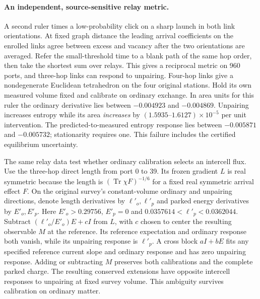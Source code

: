 \documentclass[11pt]{article}
\begin{document}
\paragraph{An independent, source-sensitive relay metric.}
A second ruler times a low-probability click on a sharp launch in
both link orientations. At fixed graph distance the leading arrival
coefficients on the enrolled links agree between excess and vacancy
after the two orientations are averaged. Refer the small-threshold
time to a blank path of the same hop order, then take the shortest
sum over relays. This gives a reciprocal metric on 960 ports, and
three-hop links can respond to unpairing. Four-hop links give a
nondegenerate Euclidean tetrahedron on the four original stations.
Hold its own measured volume fixed and calibrate on ordinary exchange.
In area units for this ruler the ordinary derivative lies between
\(-0.004923\) and \(-0.004869\). Unpairing increases entropy while
its area \emph{increases} by \((1.5935\text{--}1.6127)\times10^{-5}\)
per unit intervention. The predicted-to-measured entropy response
lies between \(-0.005871\) and \(-0.005732\); stationarity requires
one. This failure includes the certified equilibrium uncertainty.

The same relay data test whether ordinary calibration selects an
intercell flux. Use the three-hop direct length from port 0 to 39.
Its frozen gradient \(L\) is real symmetric because the length is
\((\operatorname{Tr}\chi F)^{-1/6}\) for a fixed real symmetric
arrival effect \(F\). On the original survey's constant-volume
ordinary and unpairing directions, denote length derivatives by
\(\ell'_o,\ell'_p\) and parked energy derivatives by \(E'_o,E'_p\).
Here \(E'_o>0.29756\), \(E'_p=0\) and
\(0.0357614<\ell'_p<0.0362044\). Subtract
\((\ell'_o/E'_o)E+cI\) from \(L\), with \(c\) chosen to center
the resulting observable \(M\) at the reference. Its reference
expectation and ordinary response both vanish, while its unpairing
response is \(\ell'_p\). A cross block \(aI+bE\) fits any specified
reference current slope and ordinary response and has zero unpairing
response. Adding or subtracting \(M\) preserves both calibrations
and the complete parked charge. The resulting conserved extensions
have opposite intercell responses to unpairing at fixed survey
volume. This ambiguity survives calibration on ordinary matter.
\end{document}
